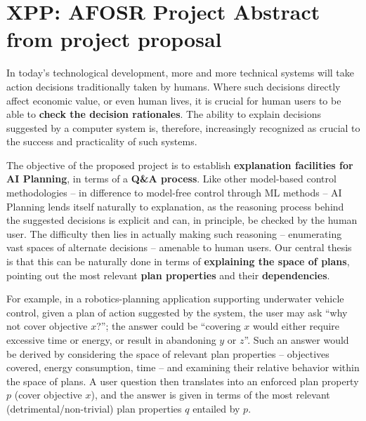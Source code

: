 \section{XPP: AFOSR Project Abstract from project proposal}
\label{xpp-abstract}

In today's technological development, more and more technical systems
will take action decisions traditionally taken by humans. Where such
decisions directly affect economic value, or even human lives, it is
crucial for human users to be able to \textbf{check the decision
  rationales}. The ability to explain decisions suggested by a
computer system is, therefore, increasingly recognized as crucial to
the success and practicality of such systems.

The objective of the proposed project is to establish
\textbf{explanation facilities for AI Planning}, in terms of a
\textbf{Q\&A process}. Like other model-based control methodologies --
in difference to model-free control through ML methods -- AI Planning
lends itself naturally to explanation, as the reasoning process behind
the suggested decisions is explicit and can, in principle, be checked
by the human user. The difficulty then lies in actually making such
reasoning -- enumerating vast spaces of alternate decisions --
amenable to human users. Our central thesis is that this can be
naturally done in terms of \textbf{explaining the space of plans},
pointing out the most relevant \textbf{plan properties} and their
\textbf{dependencies}.

For example, in a robotics-planning application supporting underwater
vehicle control, given a plan of action suggested by the system, the
user may ask ``why not cover objective $x$?''; the answer could be
``covering $x$ would either require excessive time or energy, or
result in abandoning $y$ or $z$''.
Such an answer would be derived by considering the space of relevant
plan properties -- objectives covered, energy consumption, time -- and
examining their relative behavior within the space of plans. A user
question then translates into an enforced plan property $p$ (cover
objective $x$), and the answer is given in terms of the most relevant
(detrimental/non-trivial) plan properties $q$ entailed by $p$.

